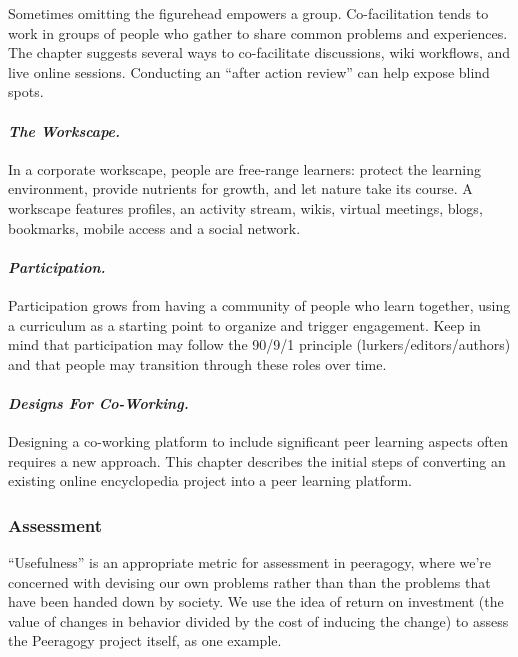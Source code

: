 Sometimes omitting the figurehead empowers a group. Co-facilitation
tends to work in groups of people who gather to share common problems
and experiences. The chapter suggests several ways to co-facilitate
discussions, wiki workflows, and live online sessions. Conducting an
``after action review'' can help expose blind spots.

\paragraph{\emph{The Workscape.}}\label{the-workscape.}

In a corporate workscape, people are free-range learners: protect the
learning environment, provide nutrients for growth, and let nature take
its course. A workscape features profiles, an activity stream, wikis,
virtual meetings, blogs, bookmarks, mobile access and a social network.

\paragraph{\emph{Participation.}}\label{participation.}

Participation grows from having a community of people who learn
together, using a curriculum as a starting point to organize and trigger
engagement. Keep in mind that participation may follow the 90/9/1
principle (lurkers/editors/authors) and that people may transition
through these roles over time.

\paragraph{\emph{Designs For
Co-Working.}}\label{designs-for-co-working.}

Designing a co-working platform to include significant peer learning
aspects often requires a new approach. This chapter describes the
initial steps of converting an existing online encyclopedia project into
a peer learning platform.

\subsubsection{Assessment}\label{assessment}

``Usefulness'' is an appropriate metric for assessment in peeragogy,
where we're concerned with devising our own problems rather than than
the problems that have been handed down by society. We use the idea of
return on investment (the value of changes in behavior divided by the
cost of inducing the change) to assess the Peeragogy project itself, as
one example.

